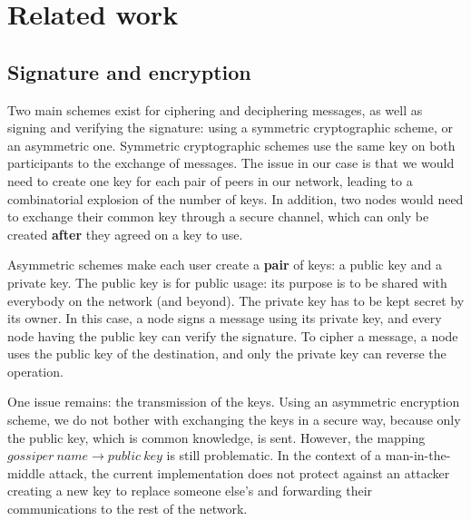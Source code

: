 \documentclass[11pt, a4paper]{article}
\begin{document}



\section{Related work}

    \subsection{Signature and encryption}

        Two main schemes exist for ciphering and deciphering messages, as well as signing and verifying the signature: using a symmetric cryptographic scheme, or an asymmetric one.
        Symmetric cryptographic schemes use the same key on both participants to the exchange of messages.
        The issue in our case is that we would need to create one key for each pair of peers in our network, leading to a combinatorial explosion of the number of keys.
        In addition, two nodes would need to exchange their common key through a secure channel, which can only be created \textbf{after} they agreed on a key to use.

        Asymmetric schemes make each user create a \textbf{pair} of keys: a public key and a private key.
        The public key is for public usage: its purpose is to be shared with everybody on the network (and beyond).
        The private key has to be kept secret by its owner.
        In this case, a node signs a message using its private key, and every node having the public key can verify the signature.
        To cipher a message, a node uses the public key of the destination, and only the private key can reverse the operation.

        One issue remains: the transmission of the keys.
        Using an asymmetric encryption scheme, we do not bother with exchanging the keys in a secure way, because only the public key, which is common knowledge, is sent.
        However, the mapping $gossiper~name \rightarrow public~key$ is still problematic.
        In the context of a man-in-the-middle attack, the current implementation does not protect against an attacker creating a new key to replace someone else's and forwarding their communications to the rest of the network.
\end{document}
